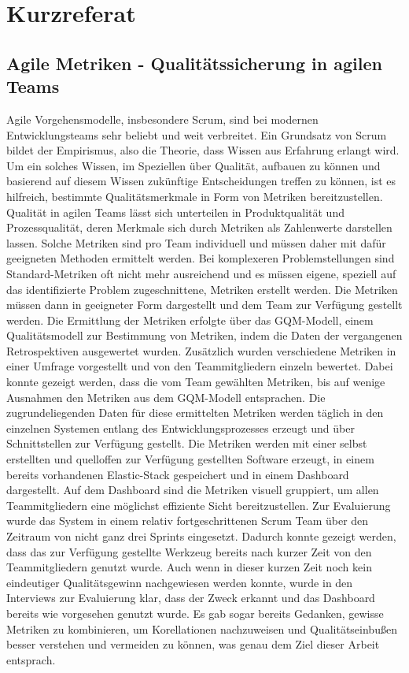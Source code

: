 \newpage
\chapter*{Kurzreferat}
\section*{Agile Metriken {-} Qualitätssicherung in agilen Teams}

Agile Vorgehensmodelle, insbesondere Scrum, sind bei modernen Entwicklungsteams sehr beliebt und weit verbreitet.
Ein Grundsatz von Scrum bildet der Empirismus, also die Theorie, dass Wissen aus Erfahrung erlangt wird.
Um ein solches Wissen, im Speziellen über Qualität, aufbauen zu können und basierend auf diesem Wissen zukünftige Entscheidungen treffen zu können, ist es hilfreich, bestimmte Qualitätsmerkmale in Form von Metriken bereitzustellen.
Qualität in agilen Teams lässt sich unterteilen in Produktqualität und Prozessqualität, deren Merkmale sich durch Metriken als Zahlenwerte darstellen lassen.
Solche Metriken sind pro Team individuell und müssen daher mit dafür geeigneten Methoden ermittelt werden.
Bei komplexeren Problemstellungen sind Standard-Metriken oft nicht mehr ausreichend und es müssen eigene, speziell auf das identifizierte Problem zugeschnittene, Metriken erstellt werden.
Die Metriken müssen dann in geeigneter Form dargestellt und dem Team zur Verfügung gestellt werden.
Die Ermittlung der Metriken erfolgte über das \ac{GQM}-Modell, einem Qualitätsmodell zur Bestimmung von Metriken, indem die Daten der vergangenen Retrospektiven ausgewertet wurden.
Zusätzlich wurden verschiedene Metriken in einer Umfrage vorgestellt und von den Teammitgliedern einzeln bewertet.
Dabei konnte gezeigt werden, dass die vom Team gewählten Metriken, bis auf wenige Ausnahmen den Metriken aus dem \ac{GQM}-Modell entsprachen.
Die zugrundeliegenden Daten für diese ermittelten Metriken werden täglich in den einzelnen Systemen entlang des Entwicklungsprozesses erzeugt und über Schnittstellen zur Verfügung gestellt.
Die Metriken werden mit einer selbst erstellten und quelloffen zur Verfügung gestellten Software erzeugt, in einem bereits vorhandenen Elastic-Stack gespeichert und in einem Dashboard dargestellt.
Auf dem Dashboard sind die Metriken visuell gruppiert, um allen Teammitgliedern eine möglichst effiziente Sicht bereitzustellen.
Zur Evaluierung wurde das System in einem relativ fortgeschrittenen Scrum Team über den Zeitraum von nicht ganz drei Sprints eingesetzt.
Dadurch konnte gezeigt werden, dass das zur Verfügung gestellte Werkzeug bereits nach kurzer Zeit von den Teammitgliedern genutzt wurde.
Auch wenn in dieser kurzen Zeit noch kein eindeutiger Qualitätsgewinn nachgewiesen werden konnte, wurde in den Interviews zur Evaluierung klar, dass der Zweck erkannt und das Dashboard bereits wie vorgesehen genutzt wurde.
Es gab sogar bereits Gedanken, gewisse Metriken zu kombinieren, um Korellationen nachzuweisen und Qualitätseinbußen besser verstehen und vermeiden zu können, was genau dem Ziel dieser Arbeit entsprach.

